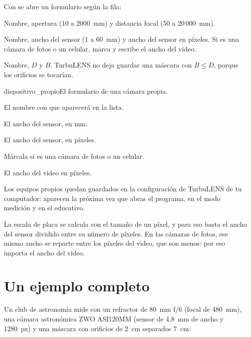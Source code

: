 Con  se abre un formulario según la fila:

\begin{description}[style=nextline,leftmargin=1.2em,font=\bfseries\color{acentoosc}]
\item[Telescopio] Nombre, apertura (10 a 2000~mm) y distancia focal (50 a 20\,000~mm).
\item[Cámara] Nombre, ancho del sensor (1 a 60~mm) y ancho del sensor en píxeles. Si es una cámara de fotos o un
celular, marca  y escribe el ancho del video.
\item[Máscara] Nombre, $D$ y $B$. TurbuLENS no deja guardar una máscara con $B \le D$, porque los orificios se tocarían.
\end{description}

\begin{capturam}[0.62\linewidth]{dispositivo_propio}{El formulario de una cámara propia.}
\item El nombre con que aparecerá en la lista.
\item El ancho del sensor, en mm.
\item El ancho del sensor, en píxeles.
\item Márcala si es una cámara de fotos o un celular.
\item El ancho del video en píxeles.
\end{capturam}

Los equipos propios quedan guardados en la configuración de TurbuLENS de tu computador: aparecen la próxima vez que
abras el programa, en el modo medición y en el educativo.

\begin{nota}
La escala de placa se calcula con el tamaño de un píxel, y para eso basta el ancho del sensor dividido entre su número
de píxeles. En las cámaras de fotos, ese mismo ancho se reparte entre los píxeles del video, que son menos: por eso
importa el ancho del video.
\end{nota}

\section{Un ejemplo completo}

Un club de astronomía mide con un refractor de 80~mm f/6 (focal de 480~mm), una cámara astronómica ZWO ASI120MM (sensor de
4,8~mm de ancho y 1280~px) y una máscara con orificios de 2~cm separados 7~cm:

